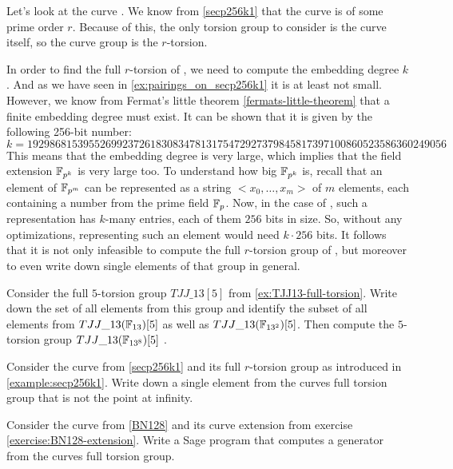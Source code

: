 \begin{example} 
\label{example:secp256k1}
Let's look at the curve . We know from \examplename{} \ref{secp256k1} that the curve is of some prime order $r$. Because of this, the only torsion group to consider is the curve itself, so the curve group is the $r$-torsion. 

In order to find the full $r$-torsion of , we need to compute the embedding degree $k$. And as we have seen in \ref{ex:pairings_on_secp256k1} it is at least not small. However, we know from Fermat's little theorem \ref{fermats-little-theorem} that a finite embedding degree must exist. It can be shown that it is given by the following 256-bit number:
$$
k = \scriptstyle 192986815395526992372618308347813175472927379845817397100860523586360249056 
$$
This means that the embedding degree is very large, which implies that the field extension $\mathbb{F}_{p^k}$ is very large too. To understand how big $\mathbb{F}_{p^k}$ is, recall that an element of $\mathbb{F}_{p^m}$ can be represented as a string $<x_0,\ldots,x_m>$ of $m$ elements, each containing a number from the prime field $\mathbb{F}_p$. Now, in the case of , such a representation has $k$-many entries, each of them $256$ bits in size. So, without any optimizations, representing such an element would need $k\cdot 256$ bits. It follows that it is not only infeasible to compute the full $r$-torsion group of , but moreover to even write down single elements of that group in general. 
\end{example}
\begin{exercise} Consider the full $5$-torsion group $TJJ\_13[5]$ from \examplename{} \ref{ex:TJJ13-full-torsion}. Write down the set of all elements from this group and identify the subset of all elements from $TJJ\_13(\mathbb{F}_{13})[5]$ as well as $TJJ\_13(\mathbb{F}_{13^2})[5]$. Then compute the $5$-torsion group $TJJ\_13(\mathbb{F}_{13^{8}})[5]$ .
\end{exercise}
\begin{exercise} Consider the curve  from \examplename{} \ref{secp256k1} and its full $r$-torsion group as introduced in \examplename{} \ref{example:secp256k1}. Write down a single element from the curves full torsion group that is not the point at infinity.
\end{exercise}
\begin{exercise}
\label{exercise:BN128-full-torsion}
 Consider the curve  from \examplename{} \ref{BN128} and its curve extension from exercise \ref{exercise:BN128-extension}. Write a Sage program that computes a generator from the curves full torsion group.
\end{exercise}

